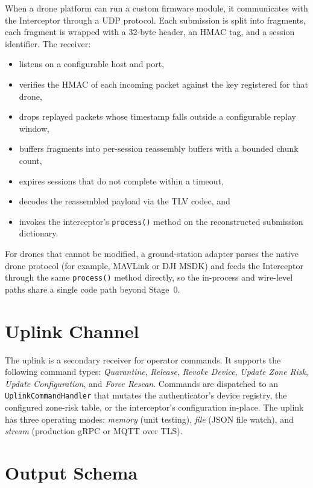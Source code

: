 \documentclass[12pt, a4paper]{report}
\begin{document}
When a drone platform can run a custom firmware module, it communicates
with the Interceptor through a UDP protocol. Each submission is split
into fragments, each fragment is wrapped with a 32-byte header, an
HMAC tag, and a session identifier. The receiver:

\begin{itemize}
    \item listens on a configurable host and port,
    \item verifies the HMAC of each incoming packet against the key
          registered for that drone,
    \item drops replayed packets whose timestamp falls outside a
          configurable replay window,
    \item buffers fragments into per-session reassembly buffers with a
          bounded chunk count,
    \item expires sessions that do not complete within a timeout,
    \item decodes the reassembled payload via the TLV codec, and
    \item invokes the interceptor's \texttt{process()} method on the
          reconstructed submission dictionary.
\end{itemize}

For drones that cannot be modified, a ground-station adapter parses the
native drone protocol (for example, MAVLink or DJI MSDK) and feeds the
Interceptor through the same \texttt{process()} method directly, so the
in-process and wire-level paths share a single code path beyond Stage~0.

\section{Uplink Channel}

The uplink is a secondary receiver for operator commands. It supports
the following command types: \emph{Quarantine}, \emph{Release},
\emph{Revoke Device}, \emph{Update Zone Risk}, \emph{Update
Configuration}, and \emph{Force Rescan}. Commands are dispatched to an
\texttt{UplinkCommandHandler} that mutates the authenticator's device
registry, the configured zone-risk table, or the interceptor's
configuration in-place. The uplink has three operating modes:
\emph{memory} (unit testing), \emph{file} (JSON file watch), and
\emph{stream} (production gRPC or MQTT over TLS).

\section{Output Schema}
\end{document}
